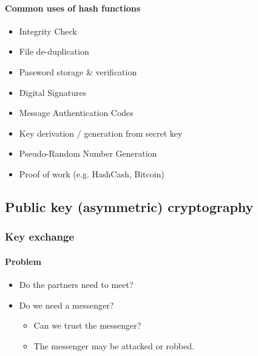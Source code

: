 \paragraph{Common uses of hash functions}
\begin{itemize}
  \item Integrity Check
  \item File de-duplication
  \item Password storage \& verification
  \item Digital Signatures
  \item Message Authentication Codes
  \item Key derivation / generation from secret key
  \item Pseudo-Random Number Generation
  \item Proof of work (e.g. HashCash, Bitcoin)
\end{itemize}

\subsection{Public key (asymmetric) cryptography}

\subsubsection{Key exchange}

\paragraph{Problem}
\begin{itemize}

  \item Do the partners need to meet?
  \item Do we need a messenger?
        \begin{itemize}
          \item Can we trust the messenger?
          \item The messenger may be attacked or robbed.
        \end{itemize}
\end{itemize}
